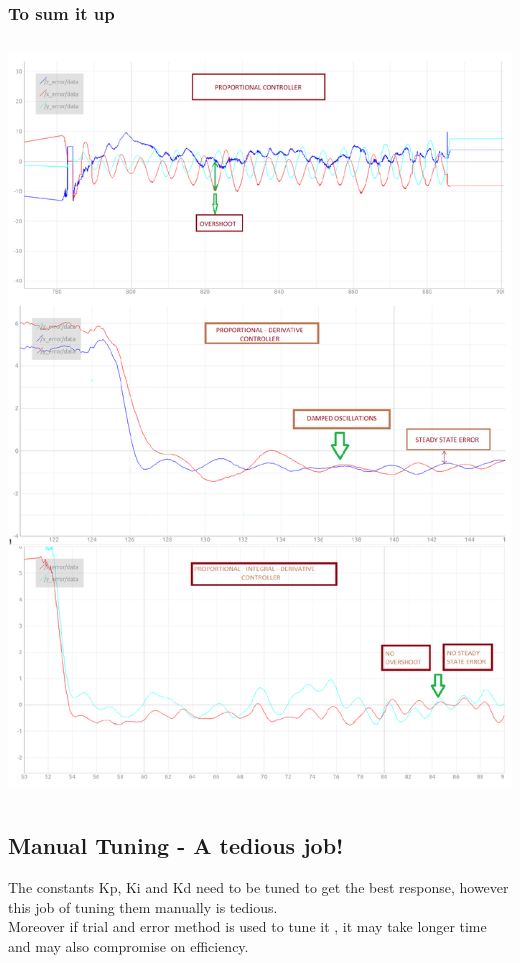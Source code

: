 \documentclass[a4paper,12pt,oneside]{book}
\begin{document}
\subsubsection{To sum it up}
\begin{flushleft}
\includegraphics[width = 15cm , height= 20cm]{ALL_PID1.png}
\end{flushleft}

\subsection{Manual Tuning - A tedious job!}
The constants Kp, Ki and Kd need to be tuned to get the best response, however this job of tuning them manually is tedious.\\
Moreover if trial and error method is used to tune it , it may take longer time and may also compromise on efficiency.
\end{document}
